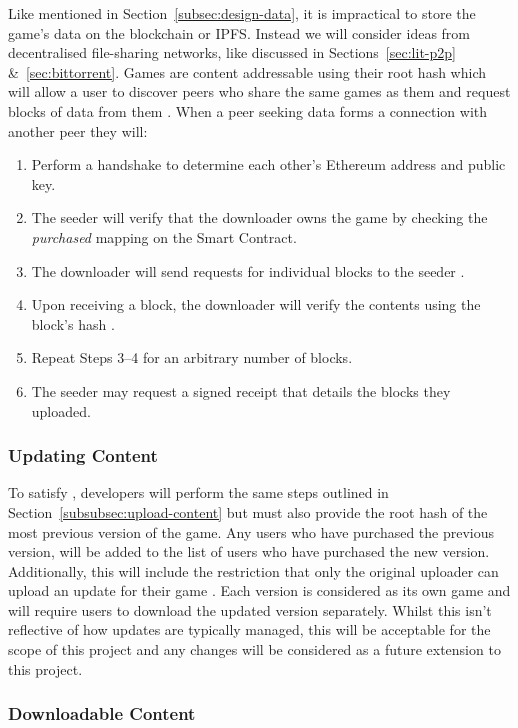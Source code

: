 Like mentioned in Section~\ref{subsec:design-data}, it is impractical to store the game's data on the blockchain or IPFS. Instead we will consider ideas from decentralised file-sharing networks, like discussed in Sections~\ref{sec:lit-p2p} \&~\ref{sec:bittorrent}.
\x
Games are content addressable using their root hash which will allow a user to discover peers who share the same games as them and request blocks of data from them . When a peer seeking data forms a connection with another peer they will:

\begin{enumerate}
  \item Perform a handshake to determine each other's Ethereum address and public key.
  \item The seeder will verify that the downloader owns the game by checking the \textit{purchased} mapping on the Smart Contract.
  \item The downloader will send requests for individual blocks to the seeder .
  \item Upon receiving a block, the downloader will verify the contents using the block's hash .
  \item Repeat Steps 3--4 for an arbitrary number of blocks.
  \item The seeder may request a signed receipt that details the blocks they uploaded.
\end{enumerate}

\subsubsection*{Updating Content}

To satisfy , developers will perform the same steps outlined in Section~\ref{subsubsec:upload-content} but must also provide the root hash of the most previous version of the game. Any users who have purchased the previous version, will be added to the list of users who have purchased the new version. Additionally, this will include the restriction that only the original uploader can upload an update for their game .
\x
Each version is considered as its own game and will require users to download the updated version separately. Whilst this isn't reflective of how updates are typically managed, this will be acceptable for the scope of this project and any changes will be considered as a future extension to this project.

\subsubsection*{Downloadable Content}

